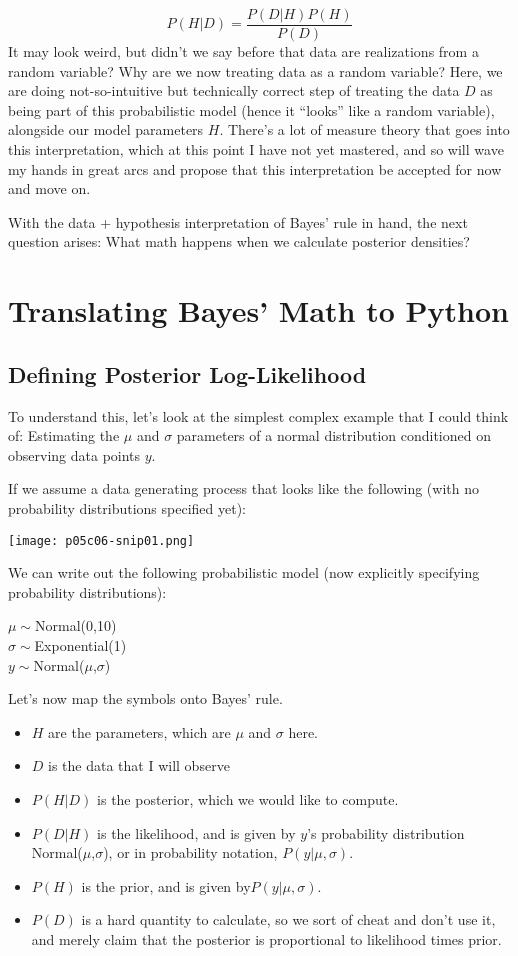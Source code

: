 \begin{equation}
P(H|D)=\frac{P(D|H)P(H)}{P(D)}
\end{equation}
It may look weird, but didn't we say before that data are realizations from a random variable? Why are we now treating data as a random variable? Here, we are doing not-so-intuitive but technically correct step of treating the data $D$
as being part of this probabilistic model (hence it ``looks'' like a random variable), alongside our model parameters $H$. There's a lot of measure theory that goes into this interpretation, which at this point I have not yet mastered, and so will wave my hands in great arcs and propose that this interpretation be accepted for now and move on.


With the data + hypothesis interpretation of Bayes' rule in hand, the next question arises: What math happens when we calculate posterior densities?

\section{Translating Bayes' Math to Python}
\subsection{Defining Posterior Log-Likelihood}

To understand this, let's look at the simplest complex example that I could think of: Estimating the $\mu$ and $\sigma$ parameters of a normal distribution conditioned on observing data points $y$.


If we assume a data generating process that looks like the following (with no probability distributions specified yet):
\begin{marginfigure}
\texttt{[image: p05c06-snip01.png]}
\end{marginfigure}

We can write out the following probabilistic model (now explicitly specifying probability distributions):

$\mu\sim$Normal(0,10)\\
$\sigma\sim$Exponential(1)\\
$y\sim$Normal($\mu$,$\sigma$)

Let's now map the symbols onto Bayes' rule.
\begin{itemize}
\item $H$ are the parameters, which are $\mu$ and $\sigma$ here.
\item $D$ is the data that I will observe
\item $P(H|D)$  is the posterior, which we would like to compute.
\item $P(D|H)$ is the likelihood, and is given by $y$'s probability distribution Normal($\mu$,$\sigma$), or in probability notation, $P(y|\mu,\sigma)$.
\item $P(H)$ is the prior, and is given by$P(y|\mu,\sigma)$.
\item $P(D)$ is a hard quantity to calculate, so we sort of cheat and don't use it, and merely claim that the posterior is proportional to likelihood times prior.
\end{itemize}

